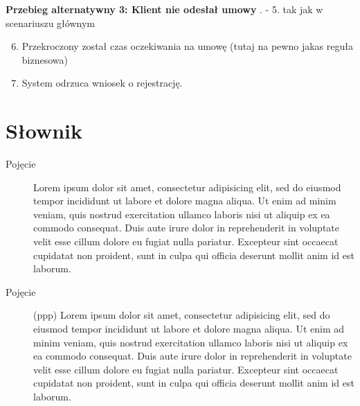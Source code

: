 \documentclass[10pt,a4paper,titlepage]{article} %
\begin{document}
		{\bf Przebieg alternatywny 3: Klient nie odesłał umowy} . - 5. tak jak w scenariuszu głównym
			\begin{enumerate}
			  \setcounter{enumi}{5}
			  \item Przekroczony został czas oczekiwania na umowę (tutaj na pewno jakas
			  reguła biznesowa)
			  \item System odrzuca wniosek o rejestrację.
			\end{enumerate}
		
\cleardoublepage

\section*{Słownik}
		
		\begin{description}
			\item[Pojęcie]
				Lorem ipsum dolor sit amet, consectetur adipisicing elit, sed do eiusmod tempor incididunt 
				ut labore et dolore magna aliqua. Ut enim ad 	minim veniam, quis nostrud exercitation 
				ullamco laboris nisi ut aliquip ex ea commodo consequat. Duis aute irure dolor in reprehenderit 
				in voluptate velit esse cillum dolore eu fugiat nulla pariatur. Excepteur sint occaecat 
				cupidatat non proident, sunt in culpa qui officia deserunt mollit anim id est laborum.				
			\item[Pojęcie] (ppp) 
				Lorem ipsum dolor sit amet, consectetur adipisicing elit, sed do eiusmod tempor incididunt 
				ut labore et dolore magna aliqua. Ut enim ad 	minim veniam, quis nostrud exercitation 
				ullamco laboris nisi ut aliquip ex ea commodo consequat. Duis aute irure dolor in reprehenderit 
				in voluptate velit esse cillum dolore eu fugiat nulla pariatur. Excepteur sint occaecat 
				cupidatat non proident, sunt in culpa qui officia deserunt mollit anim id est laborum.
		\end{description}
	
\end{document}
